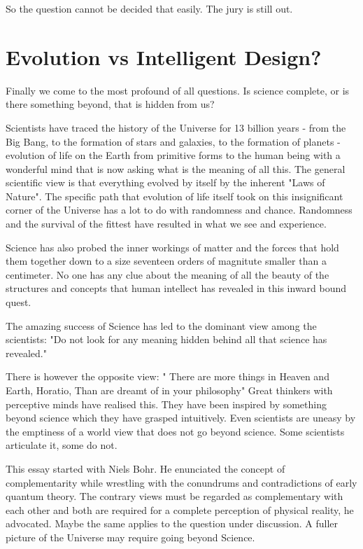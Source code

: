 So the question cannot be decided that easily. The jury 
is still out.

\section{Evolution vs Intelligent Design?}

Finally we come to the most profound of all questions. Is science
complete, or is there something beyond, that is hidden from us?

Scientists have traced the history of the Universe for 13 billion
years - from the Big Bang, to the formation of stars and galaxies,
to the formation of planets - evolution of life on the Earth from 
primitive forms to the human being with a wonderful mind that is now
asking what is the meaning of all this. The general scientific view is
that everything evolved by itself by the inherent "Laws of Nature".
The specific path that evolution of life itself took on this 
insignificant corner of the Universe has a lot to do with 
randomness and chance. Randomness and the survival of the fittest
have resulted in what we see and experience. 

Science has also probed the inner workings of matter 
and the forces that hold them together down to a size 
seventeen orders of magnitute smaller than a centimeter. 
No one has any clue about the meaning of all the beauty of 
the structures and concepts that human intellect has revealed 
in this inward bound quest.

The amazing success of Science has led to the dominant view
among the scientists: "Do not look for any meaning hidden
behind all that science has revealed."

There is however the opposite view:
" There are more things in Heaven and Earth, Horatio,
Than are dreamt of in your philosophy" 
                     \hspace{2cm}{- Shakespeare (in Hamlet, Act I, Scene V).}
Great thinkers with perceptive minds have realised this.
They have been inspired by something beyond science which they have
grasped intuitively. Even scientists are uneasy by 
the emptiness of a world view that does not go beyond science. 
Some scientists articulate it, some do not. 

This essay started with Niels Bohr. He enunciated the concept of
complementarity while wrestling with the conundrums and 
contradictions of early quantum theory. The contrary views must be
regarded as complementary with each other and both are required 
for a complete perception of physical reality, he advocated.
Maybe the same applies to the question under discussion. A fuller
picture of the Universe may require going beyond Science.



 

